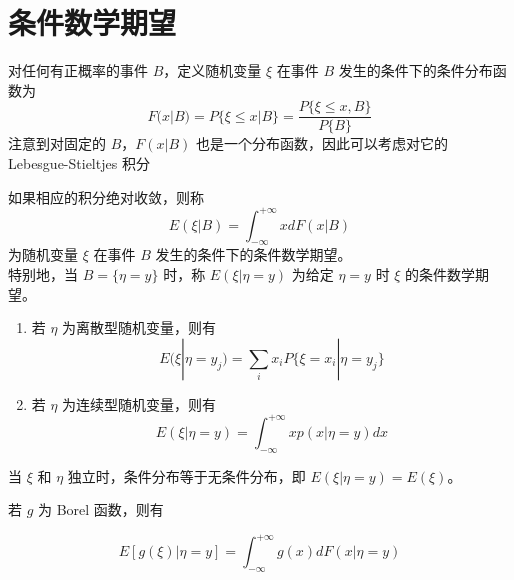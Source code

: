 \documentclass[12pt,a4paper]{amsart}
\begin{document}
\section{条件数学期望}

\begin{definition}[条件分布函数]
    对任何有正概率的事件 $B$，定义随机变量 $\xi$ 在事件 $B$ 发生的条件下的条件分布函数为
    \begin{equation}
        F(x | B) = P\{\xi \leq x | B\} = \frac{P\{\xi \leq x, B\}}{P\{B\}}
    \end{equation}
    注意到对固定的 $B$，$F(x | B)$ 也是一个分布函数，因此可以考虑对它的 Lebesgue-Stieltjes 积分
\end{definition}

\begin{definition}[条件数学期望]
    如果相应的积分绝对收敛，则称
    \begin{equation}
        E(\xi | B) = \int_{-\infty}^{+\infty} x dF(x | B)
    \end{equation}
    为随机变量 $\xi$ 在事件 $B$ 发生的条件下的条件数学期望。 \\
    特别地，当 $B = \{\eta = y\}$ 时，称 $E(\xi | \eta = y)$ 为给定 $\eta = y$ 时 $\xi$ 的条件数学期望。
\end{definition}

\begin{definition}[给定 $\eta = y$ 的条件期望]
    \begin{enumerate}
        \item 若 $\eta$ 为离散型随机变量，则有
        \begin{equation}
            E(\xi | \eta = y_j) = \sum_{i} x_i P\{\xi = x_i | \eta = y_j\}
        \end{equation}
        \item 若 $\eta$ 为连续型随机变量，则有
        \begin{equation}
            E(\xi | \eta = y) = \int_{-\infty}^{+\infty} x p(x | \eta = y) dx
        \end{equation}
    \end{enumerate}
\end{definition}

当 $\xi$ 和 $\eta$ 独立时，条件分布等于无条件分布，即 $E(\xi | \eta = y) = E(\xi)$。

若 $g$ 为 Borel 函数，则有

\begin{equation}
    E[g(\xi) | \eta = y] = \int_{-\infty}^{+\infty} g(x) dF(x | \eta = y)
\end{equation}
\end{document}
